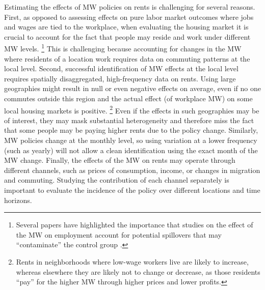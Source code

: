 Estimating the effects of MW policies on rents is challenging for several 
reasons.
First, as opposed to assessing effects on pure labor market outcomes where jobs 
and wages are tied to the workplace, when evaluating the housing market it is 
crucial to account for the fact that people may reside and work under different 
MW levels.%
\footnote{Several papers have highlighted the importance that studies
on the effect of the MW on employment account for potential spillovers that may
``contaminate'' the control group \parencite{Kuehn2016, Huang2020}.}
This is challenging because accounting for changes in the MW where residents
of a location work requires data on commuting patterns at the local level.
Second, successful identification of MW effects at the local level requires 
spatially disaggregated, high-frequency data on rents.
Using large geographies might result in null or even negative effects on average,
even if no one commutes outside this region and the actual effect (of 
workplace MW) on some local housing markets is positive.%
\footnote{Rents in neighborhoods where low-wage workers live are likely to 
increase, whereas elsewhere they are likely not to change or decrease, 
as those residents ``pay'' for the higher MW through higher prices and lower 
profits.}
Even if the effects in such geographies may be of interest, they may mask 
substantial heterogeneity and therefore miss the fact that some people may be 
paying higher rents due to the policy change.
Similarly, MW policies change at the monthly level, so using variation at a lower
frequency (such as yearly) will not allow a clean identification using the exact 
month of the MW change.
Finally, the effects of the MW on rents may operate through different channels,
such as prices of consumption, income, or changes in migration and commuting.
Studying the contribution of each channel separately is important to evaluate
the incidence of the policy over different locations and time horizons.


